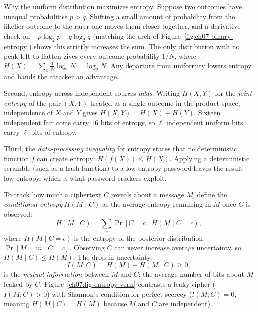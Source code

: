 \begin{whybox}
Why the uniform distribution maximizes entropy. Suppose two outcomes have unequal probabilities $p > q$. Shifting a small amount of probability from the likelier outcome to the rarer one moves them closer together, and a derivative check on $-p\log_2 p - q\log_2 q$ (matching the arch of Figure~\ref{fig:ch07-binary-entropy}) shows this strictly increases the sum. The only distribution with no peak left to flatten gives every outcome probability $1/N$, where $H(X) = \sum_{x} \frac{1}{N}\log_2 N = \log_2 N$. Any departure from uniformity lowers entropy and hands the attacker an advantage.
\end{whybox}

Second, entropy across independent sources \emph{adds}. Writing $H(X, Y)$ for the \emph{joint entropy} of the pair $(X, Y)$ treated as a single outcome in the product space, independence of $X$ and $Y$ gives $H(X, Y) = H(X) + H(Y)$. Sixteen independent fair coins carry $16$ bits of entropy, so $\ell$ independent uniform bits carry $\ell$ bits of entropy.

Third, the \emph{data-processing inequality} for entropy states that no deterministic function $f$ can create entropy: $H(f(X)) \le H(X)$. Applying a deterministic scramble (such as a hash function) to a low-entropy password leaves the result low-entropy, which is what password crackers exploit.

To track how much a ciphertext $C$ reveals about a message $M$, define the \emph{conditional entropy} $H(M \mid C)$ as the average entropy remaining in $M$ once $C$ is observed:
\[
  H(M \mid C) = \sum_{c} \Pr[C = c]\, H(M \mid C = c),
\]
where $H(M \mid C = c)$ is the entropy of the posterior distribution $\Pr[M = m \mid C = c]$. Observing $C$ can never increase average uncertainty, so $H(M \mid C) \le H(M)$. The drop in uncertainty,
\[
  I(M; C) = H(M) - H(M \mid C) \ge 0,
\]
is the \emph{mutual information} between $M$ and $C$: the average number of bits about $M$ leaked by $C$. Figure~\ref{ch07:fig-entropy-venn} contrasts a leaky cipher ($I(M; C) > 0$) with Shannon's condition for perfect secrecy ($I(M; C) = 0$, meaning $H(M \mid C) = H(M)$ because $M$ and $C$ are independent).

